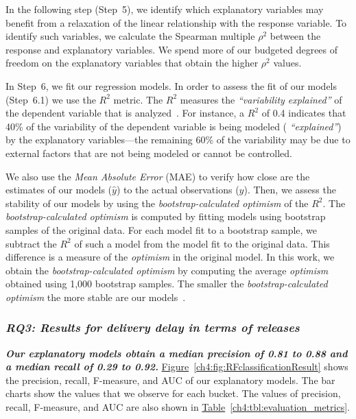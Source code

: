 In the following step (Step~5), we identify which explanatory variables may
benefit from a relaxation of the linear relationship with the response variable.
To identify such variables, we calculate the Spearman multiple $\rho^2$ between
the response and explanatory variables. We spend more of our budgeted degrees of
freedom on the explanatory variables that obtain the higher $\rho^2$ values.

In Step~6, we fit our regression models. In order to assess the fit of our
models (Step~6.1) we use the $R^2$ metric. The $R^2$ measures the {\em
``variability explained''} of the dependent variable that is
analyzed~\cite{steel1960principles}. For instance, a $R^2$ of 0.4 indicates that
40\% of the variability of the dependent variable is being modeled ({\em
``explained''}) by the explanatory variables---the remaining 60\% of the
variability may be due to external factors that are not being modeled or cannot
be controlled. 

We also use the \textit{Mean Absolute Error} (MAE) to verify how close are the
estimates of our models ($\hat{y}$) to the actual observations ($y$). Then, we
assess the stability of our models by using the \textit{bootstrap-calculated
optimism} of the $R^2$. The \textit{bootstrap-calculated optimism} is computed
by fitting models using bootstrap samples of the original data. For each model
fit to a bootstrap sample, we subtract the $R^2$ of such a model from the model
fit to the original data. This difference is a measure of the \textit{optimism}
in the original model. In this work, we obtain the \textit{bootstrap-calculated
optimism} by computing the average \textit{optimism} obtained using 1,000
bootstrap samples. The smaller the \textit{bootstrap-calculated optimism} the
more stable are our models~\cite{efron1986biased}.

\subsubsection*{\textit{\textbf{RQ3: Results for delivery delay in terms of
releases}}}

\noindent\textit{\textbf{Our explanatory models obtain a median precision of 0.81 to
0.88 and a median recall of 0.29 to 0.92.}}
\hyperref[ch4:fig:RFclassificationResult]{Figure}~\ref{ch4:fig:RFclassificationResult}
shows the precision, recall, F-measure, and AUC of our explanatory models.  The
bar charts show the values that we observe for each bucket. The values of
precision, recall, F-measure, and AUC are also shown in
\hyperref[ch4:tbl:evaluation_metrics]{Table}~\ref{ch4:tbl:evaluation_metrics}. 

